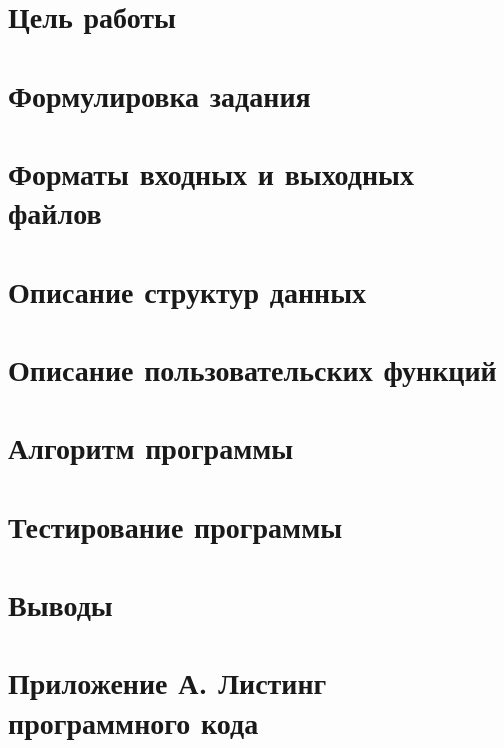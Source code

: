 \documentclass[12pt,a4paper]{article}  %
\begin{document}
	
	
	\section*{Цель работы}
	

	\section*{Формулировка задания}
	

	\section*{Форматы входных и выходных файлов}
	

	\section*{Описание структур данных}
	

	\section*{Описание пользовательских функций}
	

	\section*{Алгоритм программы}
	

	\section*{Тестирование программы}
	

	\section*{Выводы}
	

	\section*{Приложение А. Листинг программного кода}
	
\end{document}
